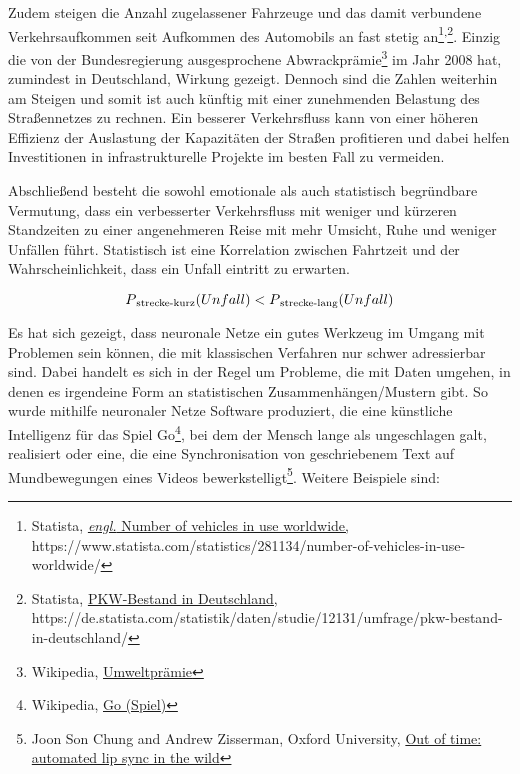 Zudem steigen die Anzahl zugelassener Fahrzeuge und das damit verbundene Verkehrsaufkommen seit Aufkommen des Automobils an fast stetig an\footnote{Statista, \href{https://www.statista.com/statistics/281134/number-of-vehicles-in-use-worldwide/}{\textit{engl.} Number of vehicles in use worldwide,} \\https://www.statista.com/statistics/281134/number-of-vehicles-in-use-worldwide/}\textsuperscript{,}\footnote{Statista, \href{https://de.statista.com/statistik/daten/studie/12131/umfrage/pkw-bestand-in-deutschland/}{PKW-Bestand in Deutschland,} \\https://de.statista.com/statistik/daten/studie/12131/umfrage/pkw-bestand-in-deutschland/}. Einzig die von der Bundesregierung ausgesprochene Abwrackprämie\footnote{Wikipedia, \href{https://de.wikipedia.org/wiki/Umweltpr\%C3\%A4mie}{Umweltprämie}} im Jahr 2008 hat, zumindest in Deutschland, Wirkung gezeigt. Dennoch sind die Zahlen weiterhin am Steigen und somit ist auch künftig mit einer zunehmenden Belastung des Straßennetzes zu rechnen. Ein besserer Verkehrsfluss kann von einer höheren Effizienz der Auslastung der Kapazitäten der Straßen profitieren und dabei helfen Investitionen in infrastrukturelle Projekte im besten Fall zu vermeiden.

Abschließend besteht die sowohl emotionale als auch statistisch begründbare Vermutung, dass ein verbesserter Verkehrsfluss mit weniger und kürzeren Standzeiten zu einer angenehmeren Reise mit mehr Umsicht, Ruhe und weniger Unfällen führt. Statistisch ist eine Korrelation zwischen Fahrtzeit und der Wahrscheinlichkeit, dass ein Unfall eintritt zu erwarten.

\[ P\textsubscript{strecke-kurz}(Unfall) < P\textsubscript{strecke-lang}(Unfall) \]

Es hat sich gezeigt, dass neuronale Netze ein gutes Werkzeug im Umgang mit Problemen sein können, die mit klassischen Verfahren nur schwer adressierbar sind. Dabei handelt es sich in der Regel um Probleme, die mit Daten umgehen, in denen es irgendeine Form an statistischen Zusammenhängen/Mustern gibt. So wurde mithilfe neuronaler Netze Software produziert, die eine künstliche Intelligenz für das Spiel Go\footnote{Wikipedia, \href{https://de.wikipedia.org/wiki/Go\_(Spiel)}{Go (Spiel)}}, bei dem der Mensch lange als ungeschlagen galt, realisiert oder eine, die eine Synchronisation von geschriebenem Text auf Mundbewegungen eines Videos bewerkstelligt\footnote{Joon Son Chung and Andrew Zisserman, Oxford University, \href{https://www.robots.ox.ac.uk/~vgg/publications/2016/Chung16a/chung16a.pdf}{Out of time: automated lip sync in the wild}}. Weitere Beispiele sind:

